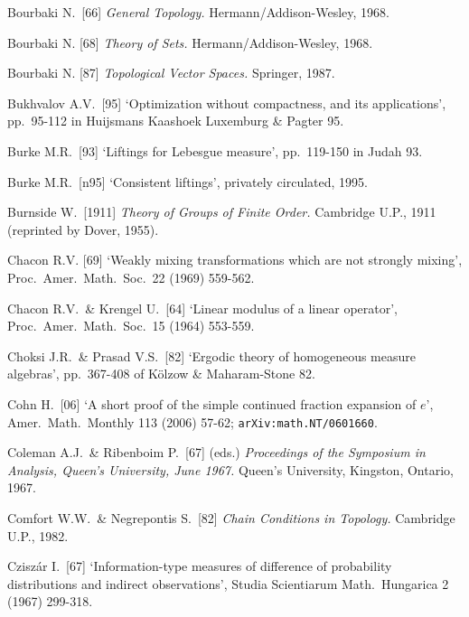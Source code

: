 {Bourbaki N.\ [66] {\it General Topology.}  Hermann/Addison-Wesley, 1968.
\cmmnt{[\S3A3, \S3A4.]}

Bourbaki N. [68] {\it Theory of Sets.}   Hermann/Addison-Wesley, 1968.
\cmmnt{[\S315 {\it notes\/}.]}

Bourbaki N. [87] {\it Topological Vector Spaces.}  Springer, 1987.
\cmmnt{[\S3A5.]}

Bukhvalov A.V.\ [95] `Optimization without compactness, and its
applications', pp.\ 95-112 in
{\smc Huijsmans Kaashoek Luxemburg \& Pagter 95}.
\cmmnt{[367U.]}

Burke M.R.\ [93] `Liftings for Lebesgue measure', pp.\ 119-150 in {\smc
Judah 93}.   \cmmnt{[341Lg, 345F.]}

Burke M.R.\ [n95] `Consistent liftings', privately circulated, 1995.
\cmmnt{[346Ya.]}

Burnside W.\ [1911] {\it Theory of Groups of Finite Order.}   Cambridge
U.P., 1911 (reprinted by Dover, 1955).
\cmmnt{[\S384 {\it notes\/}.]}

\medskip

Chacon R.V. [69]
`Weakly mixing transformations which are not strongly mixing',
Proc.\ Amer.\ Math.\ Soc.\ 22 (1969) 559-562.
\cmmnt{[372R.]}

Chacon R.V.\ \& Krengel U.\ [64] `Linear modulus of a linear
operator', Proc.\ Amer.\ Math.\ Soc.\ 15 (1964) 553-559.
\cmmnt{[\S371 {\it notes\/}.]}

Choksi J.R.\ \& Prasad V.S.\ [82] `Ergodic theory of homogeneous measure
algebras', pp.\ 367-408 of {\smc K\"olzow \& Maharam-Stone 82}.
\cmmnt{[383I.]}


Cohn H.\ [06] `A short proof of the simple continued fraction expansion of
$e$', Amer.\ Math.\ Monthly 113 (2006) 57-62;
{\tt arXiv:math.NT/0601660}.
\cmmnt{[372La.]}

Coleman A.J.\ \& Ribenboim P.\ [67] (eds.) {\it Proceedings of the Symposium in Analysis, Queen's University, June 1967.}  Queen's University, Kingston, Ontario, 1967.

Comfort W.W.\ \& Negrepontis S.\ [82] {\it Chain Conditions in
Topology.}   Cambridge U.P., 1982.   \cmmnt{[\S391 {\it notes\/}.]}


Czisz\'ar I.\ [67] `Information-type measures of difference of
probability distributions and indirect observations',
Studia Scientiarum Math.\ Hungarica 2 (1967) 299-318.   \cmmnt{[386H.]}

}
